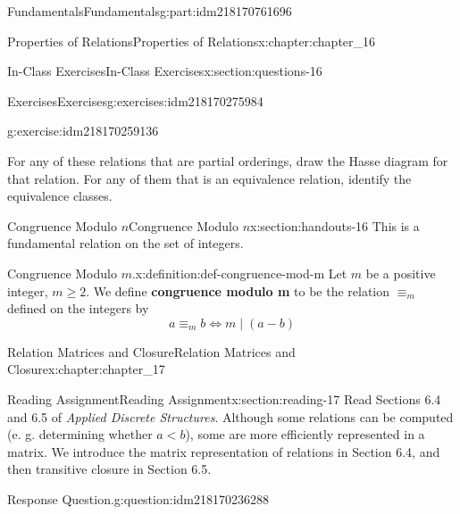 \documentclass[oneside,10pt,]{book}
\newcommand{\terminology}[1]{\textbf{#1}}
\numberwithin{equation}{section}
\newcommand{\lt}{<}
\begin{document}
\begin{partptx}{Fundamentals}{}{Fundamentals}{}{}{g:part:idm218170761696}
\begin{chapterptx}{Properties of Relations}{}{Properties of Relations}{}{}{x:chapter:chapter_16}
\begin{sectionptx}{In-Class Exercises}{}{In-Class Exercises}{}{}{x:section:questions-16}
\begin{exercises-subsection-numberless}{Exercises}{}{Exercises}{}{}{g:exercises:idm218170275984}
\begin{exercisegroup}
\begin{divisionexerciseeg}{4}{}{}{g:exercise:idm218170259136}
\begin{enumerate}[label=(\alph*)]
\end{enumerate}
For any of these relations that are partial orderings, draw the Hasse diagram for that relation.  For any of them that is an equivalence relation, identify the equivalence classes.%
\end{divisionexerciseeg}%
\end{exercisegroup}
\par\medskip\noindent
\end{exercises-subsection-numberless}
\end{sectionptx}
%
%
\typeout{************************************************}
\typeout{************************************************}
%
\begin{sectionptx}{Congruence Modulo \(n\)}{}{Congruence Modulo \(n\)}{}{}{x:section:handouts-16}
This is a fundamental relation on the set of integers.%
\begin{definition}{Congruence Modulo \(m\).}{x:definition:def-congruence-mod-m}%
%
\label{g:notation:idm218170245104}%
\label{g:notation:idm218170243408}%
Let \(m\) be a positive integer, \(m\geq 2\).  We define \terminology{congruence modulo m} to be the relation \(\equiv_m\) defined on the integers by%
\begin{equation*}
a \equiv_m b \Leftrightarrow m \mid (a-b)
\end{equation*}
%
\end{definition}
\end{sectionptx}
\end{chapterptx}
%
\typeout{************************************************}
\typeout{************************************************}
%
\begin{chapterptx}{Relation Matrices and Closure}{}{Relation Matrices and Closure}{}{}{x:chapter:chapter_17}
\index{}%
%
%
\typeout{************************************************}
\typeout{************************************************}
%
\begin{sectionptx}{Reading Assignment}{}{Reading Assignment}{}{}{x:section:reading-17}
Read Sections 6.4 and 6.5 of \emph{Applied Discrete Structures}.  Although some relations can be computed (e. g. determining whether \(a \lt b\)), some are more efficiently represented in a matrix.  We introduce the matrix representation of relations in Section 6.4, and then transitive closure in Section 6.5.%
\begin{question}{Response Question.}{g:question:idm218170236288}%

\end{question}
\end{sectionptx}
\end{chapterptx}
\end{partptx}
\end{document}
